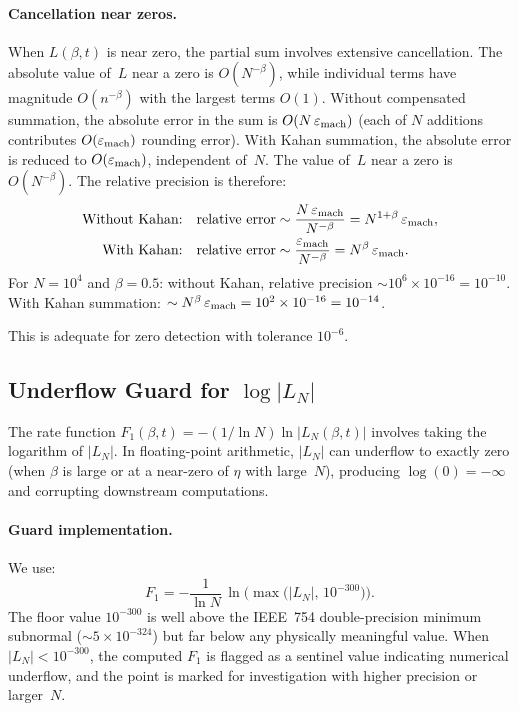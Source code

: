 \paragraph{Cancellation near zeros.}
When $L(\beta, t)$ is near zero, the partial sum involves extensive cancellation. The
absolute value of~$L$ near a zero is $O(N^{-\beta})$, while individual terms have
magnitude $O(n^{-\beta})$ with the largest terms $O(1)$. Without compensated summation,
the absolute error in the sum is $O(N\,\varepsilon_{\mathrm{mach}})$ (each of $N$ additions
contributes $O(\varepsilon_{\mathrm{mach}})$ rounding error). With Kahan summation, the absolute
error is reduced to $O(\varepsilon_{\mathrm{mach}})$, independent of~$N$. The value of~$L$ near
a zero is $O(N^{-\beta})$. The relative precision is therefore:
\begin{align}
  \text{Without Kahan:}\quad &\text{relative error}
    \sim \frac{N\,\varepsilon_{\mathrm{mach}}}{N^{-\beta}}
    = N^{1+\beta}\,\varepsilon_{\mathrm{mach}}, \label{eq:no-kahan}\\
  \text{With Kahan:}\quad &\text{relative error}
    \sim \frac{\varepsilon_{\mathrm{mach}}}{N^{-\beta}}
    = N^{\beta}\,\varepsilon_{\mathrm{mach}}. \label{eq:with-kahan}
\end{align}
For $N = 10^4$ and $\beta = 0.5$: without Kahan, relative precision
$\sim 10^6 \times 10^{-16} = 10^{-10}$. With Kahan summation:
$\sim N^\beta\,\varepsilon_{\mathrm{mach}} = 10^2 \times 10^{-16} = 10^{-14}$.

This is adequate for zero detection with tolerance $10^{-6}$.


\subsection{Underflow Guard for $\log|L_N|$}
\label{sec:underflow}

The rate function $F_1(\beta, t) = -(1/\ln N)\ln|L_N(\beta, t)|$ involves taking the
logarithm of $|L_N|$. In floating-point arithmetic, $|L_N|$ can underflow to exactly
zero (when $\beta$ is large or at a near-zero of $\eta$ with large~$N$), producing
$\log(0) = -\infty$ and corrupting downstream computations.

\paragraph{Guard implementation.}
We use:
\begin{equation}\label{eq:underflow-guard}
  F_1 = -\frac{1}{\ln N}\,\ln\bigl(\max\bigl(|L_N|,\, 10^{-300}\bigr)\bigr).
\end{equation}
The floor value $10^{-300}$ is well above the IEEE~754 double-precision minimum subnormal
($\sim 5 \times 10^{-324}$) but far below any physically meaningful value. When
$|L_N| < 10^{-300}$, the computed $F_1$ is flagged as a sentinel value indicating
numerical underflow, and the point is marked for investigation with higher precision or
larger~$N$.

